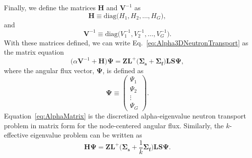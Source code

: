 Finally, we define the matrices $\mathbf{H}$ and $\mathbf{V}^{-1}$ as
\begin{equation}
	\mathbf{H} \equiv \text{diag} \big ( H_{1}, H_{2}, \dots, H_{G} \big ),
\end{equation}
and
\begin{equation}
	\mathbf{V}^{-1} \equiv \text{diag} \big ( V^{-1}_{1}, V^{-1}_{2}, \dots, V^{-1}_{G} \big ).
\end{equation}
With these matrices defined, we can write Eq.~\ref{eq:Alpha3DNeutronTransport} as the matrix equation
\begin{equation}
	\big ( \alpha \mathbf{V}^{-1} + \mathbf{H} \big ) \mathbf{\Psi} = \mathbf{Z} \mathbf{L}^{+} \big ( \mathbf{\Sigma_{s}} + \mathbf{\Sigma_{f}} \big ) \mathbf{L} \mathbf{S} \mathbf{\Psi},
	\label{eq:AlphaMatrix}
\end{equation}
where the angular flux vector, $\mathbf{\Psi}$, is defined as
\begin{equation}
	\mathbf{\Psi} \equiv \begin{pmatrix}
					\Psi_{1} \\
					\Psi_{2} \\
					\vdots \\
					\Psi_{G}
					\end{pmatrix}.
\end{equation}
Equation~\ref{eq:AlphaMatrix} is the discretized alpha-eigenvalue neutron transport problem in matrix form for the node-centered angular flux. Similarly, the $k$-effective eigenvalue problem can be written as 
\begin{equation}
	\mathbf{H} \mathbf{\Psi} = \mathbf{Z} \mathbf{L}^{+} \bigg ( \mathbf{\Sigma_{s}} + \frac{1}{k}\mathbf{\Sigma_{f}} \bigg ) \mathbf{L} \mathbf{S} \mathbf{\Psi}.
	\label{eq:kMatrix}
\end{equation}

